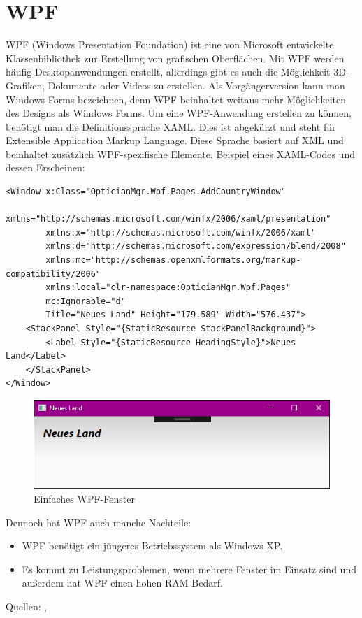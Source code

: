 \section{WPF}
WPF (Windows Presentation Foundation) ist eine von Microsoft entwickelte Klassenbibliothek zur Erstellung von grafischen Oberflächen. Mit WPF werden häufig Desktopanwendungen erstellt, allerdings gibt es auch die Möglichkeit 3D-Grafiken, Dokumente oder Videos zu erstellen. Als Vorgängerversion kann man Windows Forms bezeichnen, denn WPF beinhaltet weitaus mehr Möglichkeiten des Designs als Windows Forms.
Um eine WPF-Anwendung erstellen zu können, benötigt man die Definitionssprache XAML. Dies ist abgekürzt und steht für Extensible Application Markup Language. Diese Sprache basiert auf XML und beinhaltet zusätzlich WPF-spezifische Elemente. \newline Beispiel eines XAML-Codes und dessen Erscheinen: 
\begin{lstlisting}
<Window x:Class="OpticianMgr.Wpf.Pages.AddCountryWindow"
        xmlns="http://schemas.microsoft.com/winfx/2006/xaml/presentation"
        xmlns:x="http://schemas.microsoft.com/winfx/2006/xaml"
        xmlns:d="http://schemas.microsoft.com/expression/blend/2008"
        xmlns:mc="http://schemas.openxmlformats.org/markup-compatibility/2006"
        xmlns:local="clr-namespace:OpticianMgr.Wpf.Pages"
        mc:Ignorable="d"
        Title="Neues Land" Height="179.589" Width="576.437">
    <StackPanel Style="{StaticResource StackPanelBackground}">
        <Label Style="{StaticResource HeadingStyle}">Neues Land</Label>
    </StackPanel>
</Window>
\end{lstlisting}
\begin{figure}[H]
\begin{center}
	\includegraphics[scale=.6]{images/Wpf.png}
\end{center}
	\caption{Einfaches WPF-Fenster}
	\label{fig:sample}
\end{figure}
Dennoch hat WPF auch manche Nachteile:
\begin{itemize}
\item WPF benötigt ein jüngeres Betriebssystem als Windows XP.
\item Es kommt zu Leistungsproblemen, wenn mehrere Fenster im Einsatz sind und außerdem hat WPF einen hohen RAM-Bedarf.
\end{itemize}
Quellen: \cite{it-visions_was_2018}, \cite{schwichtenberg_vor-_2018}
